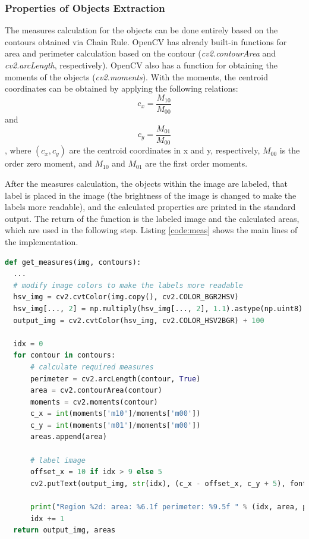 \documentclass[]{IEEEtran}
\begin{document}
\subsubsection{Properties of Objects Extraction}
The measures calculation for the objects can be done entirely based on the contours obtained via Chain Rule. OpenCV has already built-in functions for area and perimeter calculation based on the contour (\textit{cv2.contourArea} and \textit{cv2.arcLength}, respectively). OpenCV also has a function for obtaining the moments of the objects (\textit{cv2.moments}). With the moments, the centroid coordinates can be obtained by applying the following relations:
\begin{equation}
  c_{x} = \dfrac{M_{10}}{M_{00}}
\end{equation}
 and 
\begin{equation}
  c_{y} = \dfrac{M_{01}}{M_{00}}
\end{equation},
where $(c_{x}, c_{y})$ are the centroid coordinates in x and y, respectively, $M_{00}$ is the order zero moment, and $M_{10}$ and $M_{01}$ are the first order moments.
\par After the measures calculation, the objects within the image are labeled, that label is placed in the image (the brightness of the image is changed to make the labels more readable), and the calculated properties are printed in the standard output. The return of the function is the labeled image and the calculated areas, which are used in the following step.
Listing \ref{code:meas} shows the main lines of the implementation.

\begin{lstlisting}[language=Python, caption={Properties Extraction Implementation}, label={code:meas}]
def get_measures(img, contours):
  ...
  # modify image colors to make the labels more readable
  hsv_img = cv2.cvtColor(img.copy(), cv2.COLOR_BGR2HSV)
  hsv_img[..., 2] = np.multiply(hsv_img[..., 2], 1.1).astype(np.uint8)
  output_img = cv2.cvtColor(hsv_img, cv2.COLOR_HSV2BGR) + 100

  idx = 0
  for contour in contours:
      # calculate required measures
      perimeter = cv2.arcLength(contour, True)
      area = cv2.contourArea(contour)
      moments = cv2.moments(contour)
      c_x = int(moments['m10']/moments['m00'])
      c_y = int(moments['m01']/moments['m00'])
      areas.append(area)

      # label image
      offset_x = 10 if idx > 9 else 5
      cv2.putText(output_img, str(idx), (c_x - offset_x, c_y + 5), font, 0.5, (0, 0, 0), 2)

      print("Region %2d: area: %6.1f perimeter: %9.5f " % (idx, area, perimeter))
      idx += 1
  return output_img, areas
\end{lstlisting}
\end{document}
